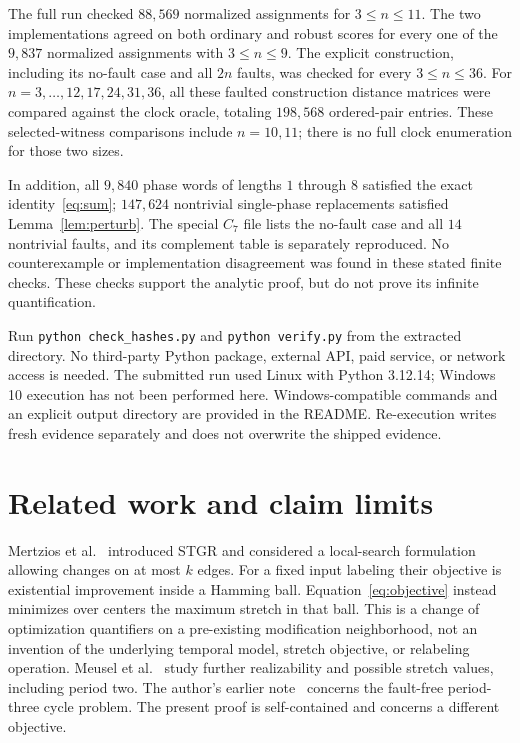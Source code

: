 \documentclass[11pt,a4paper]{article}
\begin{document}
The full run checked $88{,}569$ normalized assignments for $3\le n\le11$. The two implementations agreed on both ordinary and robust scores for every one of the $9{,}837$ normalized assignments with $3\le n\le9$. The explicit construction, including its no-fault case and all $2n$ faults, was checked for every $3\le n\le36$. For $n=3,\ldots,12,17,24,31,36$, all these faulted construction distance matrices were compared against the clock oracle, totaling $198{,}568$ ordered-pair entries. These selected-witness comparisons include $n=10,11$; there is no full clock enumeration for those two sizes.

In addition, all $9{,}840$ phase words of lengths $1$ through $8$ satisfied the exact identity~\eqref{eq:sum}; $147{,}624$ nontrivial single-phase replacements satisfied Lemma~\ref{lem:perturb}. The special $C_7$ file lists the no-fault case and all $14$ nontrivial faults, and its complement table is separately reproduced. No counterexample or implementation disagreement was found in these stated finite checks. These checks support the analytic proof, but do not prove its infinite quantification.

Run \texttt{python check\_hashes.py} and \texttt{python verify.py} from the extracted directory. No third-party Python package, external API, paid service, or network access is needed. The submitted run used Linux with Python 3.12.14; Windows 10 execution has not been performed here. Windows-compatible commands and an explicit output directory are provided in the README. Re-execution writes fresh evidence separately and does not overwrite the shipped evidence.

\section{Related work and claim limits}
Mertzios et al.~\cite{mertzios} introduced STGR and considered a local-search formulation allowing changes on at most $k$ edges. For a fixed input labeling their objective is existential improvement inside a Hamming ball. Equation~\eqref{eq:objective} instead minimizes over centers the maximum stretch in that ball. This is a change of optimization quantifiers on a pre-existing modification neighborhood, not an invention of the underlying temporal model, stretch objective, or relabeling operation. Meusel et al.~\cite{meusel} study further realizability and possible stretch values, including period two. The author's earlier note~\cite{yonezu27} concerns the fault-free period-three cycle problem. The present proof is self-contained and concerns a different objective.
\end{document}
